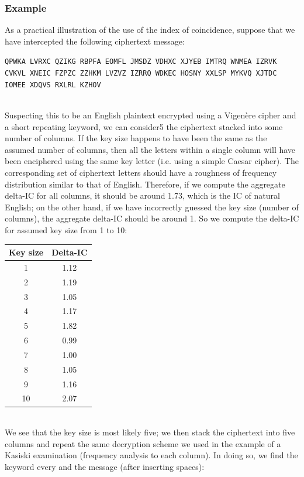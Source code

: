 \documentclass[Lau,binding=0.6cm,oneside]{sapthesis}
\begin{document}
\subsubsection{Example}
As a practical illustration of the use of the index of coincidence, suppose that we have intercepted the following ciphertext message:
\begin{displayquote}{\small{\texttt{QPWKA LVRXC QZIKG RBPFA EOMFL  JMSDZ VDHXC XJYEB IMTRQ WNMEA IZRVK CVKVL XNEIC FZPZC ZZHKM  LVZVZ IZRRQ WDKEC HOSNY XXLSP
MYKVQ XJTDC IOMEE XDQVS RXLRL  KZHOV}}}
\end{displayquote}
\ \\
Suspecting this to be an English plaintext encrypted using a Vigenère cipher and a short repeating keyword, we can consider5 the ciphertext stacked into some number of columns. If the key size happens to have been the same as the assumed number of columns, then all the letters within a single column will have been enciphered using the same key letter (i.e. using a simple Caesar cipher). The corresponding set of ciphertext letters should have a roughness of frequency distribution similar to that of English. Therefore, if we compute the aggregate delta-IC for all columns, it should be around 1.73, which is the IC of natural English; on the other hand, if we have incorrectly guessed the key size (number of columns), the aggregate delta-IC should be around 1. So we compute the delta-IC for assumed key size from 1 to 10:\\

\begin{center}
 \begin{tabular}{||c c||} 
 \hline
 Key size & Delta-IC\\ [0.5ex] 
 \hline\hline
 1 & 1.12\\ 
 \hline
 2 & 1.19\\
 \hline
 3 & 1.05\\
 \hline
 4 & 1.17\\
 \hline
 5 & 1.82\\
 \hline
 6 & 0.99\\
 \hline
 7 & 1.00\\
 \hline
 8 & 1.05\\
 \hline
 9 & 1.16\\
 \hline
 10 & 2.07\\
 \hline
\end{tabular}
\end{center}
\ \\
We see that the key size is most likely five; we then stack the ciphertext into five columns and repeat the same decryption scheme we used in the example of a Kasiski examination (frequency analysis to each column). In doing so, we find the keyword \textsf{every} and the message (after inserting spaces):\\
\end{document}
